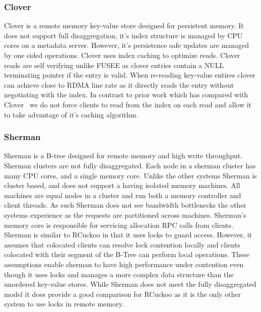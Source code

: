 \subsubsection{Clover}

Clover is a remote memory key-value store designed for
persistent memory. It does not support full disaggregation,
it's index structure is managed by CPU cores on a metadata
server. However, it's persistence safe updates are managed
by one sided operations. Clover uses index caching to
optimize reads. Clover reads are self verifying unlike FUSEE
as clover entries contain a NULL terminating pointer if the
entry is valid. When re-reading key-value entires clover can
achieve close to RDMA line rate as it directly reads the
entry without negotiating with the index. In contrast to
prior work which has compared with Clover~\cite{fusee} we do
not force clients to read from the index on each read and
allow it to take advantage of it's caching algorithm.

\subsubsection{Sherman}

Sherman is a B-tree designed for remote memory and high
write throughput. Sherman clusters are not fully
disaggregated.  Each node in a sherman cluster has many CPU
cores, and a single memory core. Unlike the other systems
Sherman is cluster based, and does not support a having
isolated memory machines. All machines are equal nodes in a
cluster and run both a memory controller and client threads.
As such Sherman does not see bandwidth bottlenecks the other
systems experience as the requests are partitioned across
machines.  Sherman's memory core is responsible for
servicing allocation RPC calls from clients. Sherman is
similar to RCuckoo in that it uses locks to guard access.
However, it assumes that colocated clients can resolve lock
contention locally and clients colocated with their segment
of the B-Tree can perform local operations. These
assumptions enable sherman to have high performance under
contention even though it uses locks and manages a more
complex data structure than the unordered key-value stores.
While Sherman does not meet the fully disaggregated model it
does provide a good comparison for RCuckoo as it is the only
other system to use locks in remote memory.



